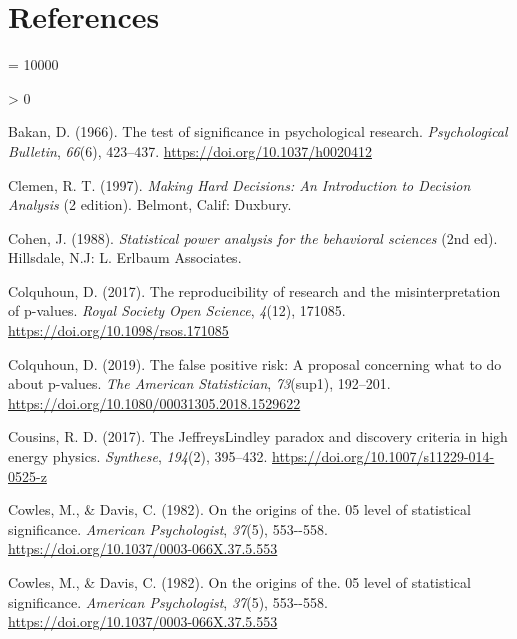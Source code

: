 \documentclass[
  english,
  ,man, a4paper,floatsintext]{apa6}
\newlength{\cslhangindent}
\newenvironment{CSLReferences}[2] %
 {%
  \setlength{\parindent}{0pt}
  \ifodd #1 \everypar{\setlength{\hangindent}{\cslhangindent}}\ignorespaces\fi
  \ifnum #2 > 0
  \setlength{\parskip}{#2\baselineskip}
  \fi
 }%
 {}
\begin{document}
\newpage

\hypertarget{references}{%
\section{References}\label{references}}

\begingroup

\interlinepenalty = 10000

\hypertarget{refs}{}
\begin{CSLReferences}{1}{0}
\leavevmode\hypertarget{ref-bakan_test_1966}{}%
Bakan, D. (1966). The test of significance in psychological research. \emph{Psychological Bulletin}, \emph{66}(6), 423--437. \url{https://doi.org/10.1037/h0020412}

\leavevmode\hypertarget{ref-clemen_making_1997}{}%
Clemen, R. T. (1997). \emph{Making {Hard} {Decisions}: {An} {Introduction} to {Decision} {Analysis}} (2 edition). Belmont, Calif: Duxbury.

\leavevmode\hypertarget{ref-cohen_statistical_1988}{}%
Cohen, J. (1988). \emph{Statistical power analysis for the behavioral sciences} (2nd ed). {Hillsdale, N.J}: {L. Erlbaum Associates}.

\leavevmode\hypertarget{ref-colquhoun_reproducibility_2017}{}%
Colquhoun, D. (2017). The reproducibility of research and the misinterpretation of p-values. \emph{Royal Society Open Science}, \emph{4}(12), 171085. \url{https://doi.org/10.1098/rsos.171085}

\leavevmode\hypertarget{ref-colquhoun_false_2019}{}%
Colquhoun, D. (2019). The false positive risk: A proposal concerning what to do about p-values. \emph{The American Statistician}, \emph{73}(sup1), 192--201. \url{https://doi.org/10.1080/00031305.2018.1529622}

\leavevmode\hypertarget{ref-cousins_jeffreyslindley_2017}{}%
Cousins, R. D. (2017). The {Jeffreys}{{Lindley}} paradox and discovery criteria in high energy physics. \emph{Synthese}, \emph{194}(2), 395--432. \url{https://doi.org/10.1007/s11229-014-0525-z}

\leavevmode\hypertarget{ref-cowles_origins_1982}{}%
Cowles, M., \& Davis, C. (1982). On the origins of the. 05 level of statistical significance. \emph{American Psychologist}, \emph{37}(5), 553-\/-558. \url{https://doi.org/10.1037/0003-066X.37.5.553}

\leavevmode\hypertarget{ref-cowles_origins_1982}{}%
Cowles, M., \& Davis, C. (1982). On the origins of the. 05 level of statistical significance. \emph{American Psychologist}, \emph{37}(5), 553-\/-558. \url{https://doi.org/10.1037/0003-066X.37.5.553}


\end{CSLReferences}
\end{document}
